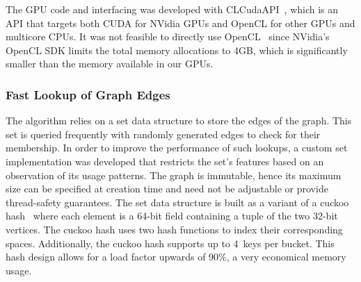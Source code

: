 \begin{comment}
\textit{\bf !!! Remove the history approach !!!}
Initially, the system was developed using OpenCL~\cite{opencl} in order to
accelerate the computations of the algorithm. OpenCL was chosen as it provides
a common abstraction for a variety of compute devices.
However, NVidia's OpenCL SDK limits the
total memory allocations within a context to 4GB which severely limits the
problem sizes that can be tackled on GPUs. Therefore, we migrated the system to
use the abstraction layer CLCudaAPI~\cite{claduc}
to support both OpenCL and CUDA~\cite{Nickolls:2008:SPP:1365490.1365500}
as back-ends.
%
CLCudaAPI
hides the difference between OpenCL and the CUDA driver API.
For example, the library provides abstractions for Device, Context, Queue and
Buffer. Additionally, the implementations use a combination of inline functions
and preprocessor macros to abstract away the differences between OpenCL's and
CUDA's primitive types, address spaces and functions.
\end{comment}
The GPU code and interfacing was developed with CLCudaAPI~\cite{claduc}, which
is an API that targets both CUDA for NVidia GPUs and OpenCL for other GPUs and
multicore CPUs. It was not feasible to directly use OpenCL~\cite{opencl} since
NVidia's OpenCL SDK limits the total memory allocations to 4GB, which is
significantly smaller than the memory available in our GPUs.

\subsubsection{Fast Lookup of Graph Edges}

The algorithm relies on a set data structure to store the edges of the graph.
This set is queried frequently with randomly generated edges to check for their
membership. In order to improve the performance of such lookups, a custom set
implementation was developed that restricts the set's features based on an
observation of its usage patterns.
The graph is immutable, hence its maximum
size can be specified at creation time and need not be adjustable or provide
thread-safety guarantees. The set data
structure is built as a variant of a cuckoo
hash~\cite{Pagh:2004:CH:1006424.1006426} where each element is a 64-bit
field containing a tuple of the two 32-bit vertices. The cuckoo hash
uses two hash functions to index their corresponding spaces. Additionally, the
cuckoo hash supports up to 4~keys per bucket. This hash design allows for a load
factor upwards of 90\%, a very economical memory usage.

